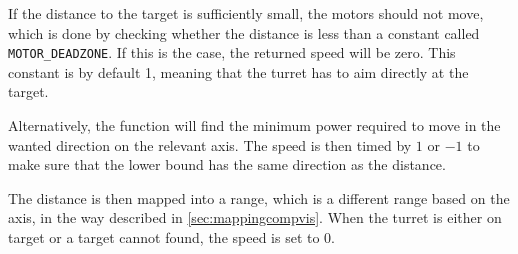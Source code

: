 If the distance to the target is sufficiently small, the motors should not move, which is done by checking whether the distance is less than a constant called \texttt{MOTOR\_DEADZONE}.
If this is the case, the returned speed will be zero.
This constant is by default 1, meaning that the turret has to aim directly at the target.

Alternatively, the function will find the minimum power required to move in the wanted direction on the relevant axis.
The speed is then timed by $1$ or $-1$ to make sure that the lower bound has the same direction as the distance.

The distance is then mapped into a range, which is a different range based on the axis, in the way described in \autoref{sec:mappingcompvis}.
When the turret is either on target or a target cannot found, the speed is set to $0$.
